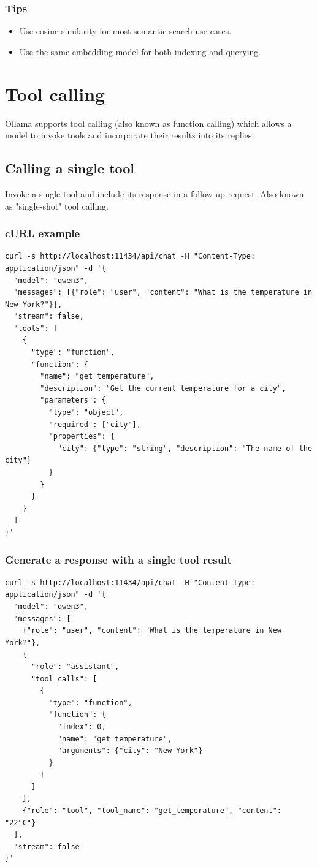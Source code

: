 \documentclass[12pt,UTF8]{ctexbook}
\begin{document}
\subsubsection{Tips}

\begin{itemize}
  \item Use cosine similarity for most semantic search use cases.
  \item Use the same embedding model for both indexing and querying.
\end{itemize}

\section{Tool calling}

Ollama supports tool calling (also known as function calling) which allows a model to invoke tools and incorporate their results into its replies.

\subsection{Calling a single tool}
Invoke a single tool and include its response in a follow-up request. Also known as "single-shot" tool calling.

\subsubsection{cURL example}
\begin{verbatim}
curl -s http://localhost:11434/api/chat -H "Content-Type: application/json" -d '{
  "model": "qwen3",
  "messages": [{"role": "user", "content": "What is the temperature in New York?"}],
  "stream": false,
  "tools": [
    {
      "type": "function",
      "function": {
        "name": "get_temperature",
        "description": "Get the current temperature for a city",
        "parameters": {
          "type": "object",
          "required": ["city"],
          "properties": {
            "city": {"type": "string", "description": "The name of the city"}
          }
        }
      }
    }
  ]
}'
\end{verbatim}

\subsubsection{Generate a response with a single tool result}
\begin{verbatim}
curl -s http://localhost:11434/api/chat -H "Content-Type: application/json" -d '{
  "model": "qwen3",
  "messages": [
    {"role": "user", "content": "What is the temperature in New York?"},
    {
      "role": "assistant",
      "tool_calls": [
        {
          "type": "function",
          "function": {
            "index": 0,
            "name": "get_temperature",
            "arguments": {"city": "New York"}
          }
        }
      ]
    },
    {"role": "tool", "tool_name": "get_temperature", "content": "22°C"}
  ],
  "stream": false
}'
\end{verbatim}
\end{document}
